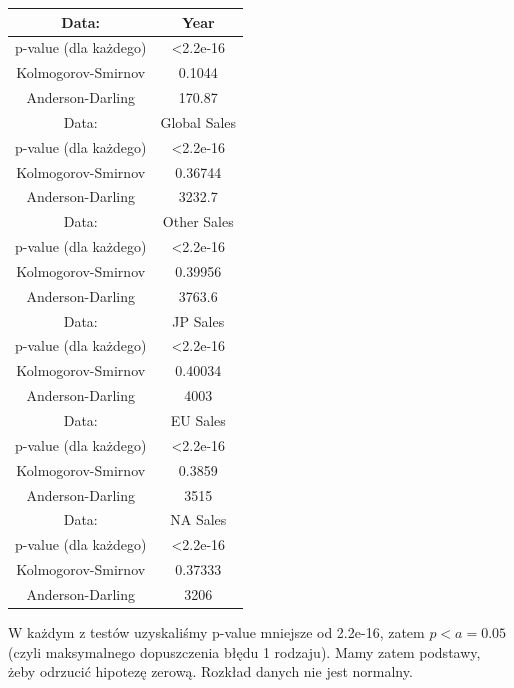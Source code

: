 \documentclass[12pt]{article}
\begin{document}
	\begin{table}[H]
		\centering
		\begin{tabular}{|c|c|}
			\hline
			\rowcolor[HTML]{00FFFF} 
			Data:              & Year                            \\ \hline
			p-value (dla każdego)            & \textless{}2.2e-16              \\ \hline
			Kolmogorov-Smirnov & \cellcolor[HTML]{FFFFFF}0.1044  \\ \hline
			\rowcolor[HTML]{FFFFFF} 
			Anderson-Darling   & 170.87                          \\ \hline
			\rowcolor[HTML]{00FFFF} 
			Data:              & Global Sales                    \\ \hline
			p-value (dla każdego)            & \textless{}2.2e-16              \\ \hline
			Kolmogorov-Smirnov & \cellcolor[HTML]{FFFFFF}0.36744 \\ \hline
			Anderson-Darling   & \cellcolor[HTML]{FFFFFF}3232.7  \\ \hline
			\rowcolor[HTML]{00FFFF} 
			Data:              & Other Sales                    \\ \hline
			p-value (dla każdego)            & \textless{}2.2e-16              \\ \hline
			Kolmogorov-Smirnov & \cellcolor[HTML]{FFFFFF} 0.39956 \\ \hline
			Anderson-Darling   & \cellcolor[HTML]{FFFFFF}3763.6  \\ \hline
			\rowcolor[HTML]{00FFFF} 
			Data:              & JP Sales                    \\ \hline
			p-value (dla każdego)            & \textless{}2.2e-16              \\ \hline
			Kolmogorov-Smirnov & \cellcolor[HTML]{FFFFFF} 0.40034 \\ \hline
			Anderson-Darling   & \cellcolor[HTML]{FFFFFF}4003  \\ \hline
			\rowcolor[HTML]{00FFFF} 
						Data:              & EU Sales                    \\ \hline
			p-value (dla każdego)            & \textless{}2.2e-16              \\ \hline
			Kolmogorov-Smirnov & \cellcolor[HTML]{FFFFFF} 0.3859 \\ \hline
			Anderson-Darling   & \cellcolor[HTML]{FFFFFF}3515  \\ \hline
			\rowcolor[HTML]{00FFFF} 
			Data:              & NA Sales                    \\ \hline
			p-value (dla każdego)            & \textless{}2.2e-16              \\ \hline
			Kolmogorov-Smirnov & \cellcolor[HTML]{FFFFFF}  0.37333 \\ \hline
			Anderson-Darling   & \cellcolor[HTML]{FFFFFF}3206  \\ \hline
		\end{tabular}
	\end{table}
	W każdym z testów uzyskaliśmy p-value mniejsze od 2.2e-16, zatem \(p<a=0.05\) (czyli maksymalnego dopuszczenia błędu 1 rodzaju).
	Mamy zatem podstawy, żeby odrzucić hipotezę zerową. Rozkład danych nie jest normalny.
	
\end{document}
